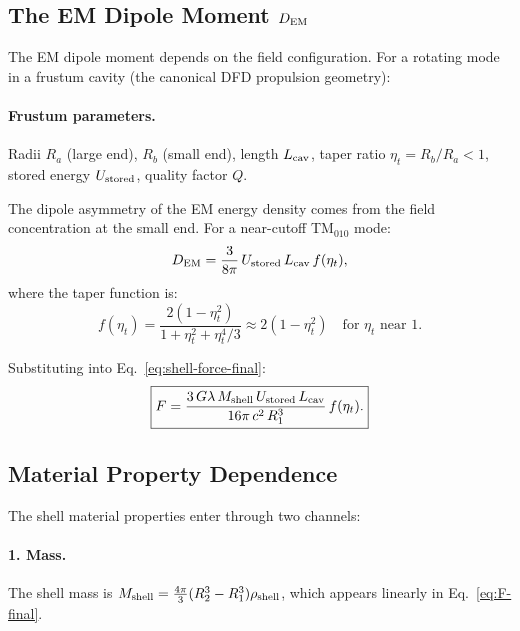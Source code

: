 \documentclass[aps,prd,twocolumn,superscriptaddress,floatfix,nofootinbib]{revtex4-2}
\newcommand{\lam}{\lambda}
\begin{document}
\subsection{The EM Dipole Moment $D_{\rm EM}$}
\label{sec:dipole-moment}

The EM dipole moment depends on the field configuration. For a
rotating mode in a frustum cavity (the canonical DFD propulsion
geometry):

\paragraph{Frustum parameters.}
Radii $R_a$ (large end), $R_b$ (small end), length $L_{\rm cav}$,
taper ratio $\eta_t = R_b/R_a < 1$, stored energy $U_{\rm stored}$,
quality factor $Q$.

The dipole asymmetry of the EM energy density comes from the
field concentration at the small end. For a near-cutoff TM$_{010}$
mode:
\begin{equation}
D_{\rm EM} = \frac{3}{8\pi}\,U_{\rm stored}\,L_{\rm cav}\,
f(\eta_t),
\end{equation}
where the taper function is:
\begin{equation}
f(\eta_t) = \frac{2(1 - \eta_t^2)}{1 + \eta_t^2 + \eta_t^4/3}
\approx 2(1 - \eta_t^2) \quad \text{for } \eta_t \text{ near } 1.
\end{equation}

Substituting into Eq.~\eqref{eq:shell-force-final}:
\begin{equation}
\boxed{
F = \frac{3\,G\lam\,M_{\rm shell}\,U_{\rm stored}\,L_{\rm cav}}
{16\pi\,c^2\,R_1^3}\,f(\eta_t).
}
\label{eq:F-final}
\end{equation}

\subsection{Material Property Dependence}
\label{sec:material}

The shell material properties enter through two channels:

\paragraph{1. Mass.} The shell mass is
$M_{\rm shell} = \frac{4\pi}{3}(R_2^3 - R_1^3)\rho_{\rm shell}$,
which appears linearly in Eq.~\eqref{eq:F-final}.
\end{document}
